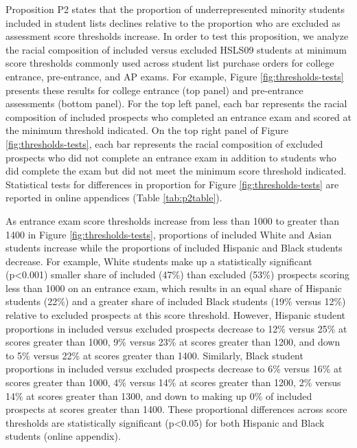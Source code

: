 \documentclass[
  12pt,
]{article}
\begin{document}
Proposition P2 states that the proportion of underrepresented minority students included in student lists declines relative to the proportion who are excluded as assessment score thresholds increase. In order to test this proposition, we analyze the racial composition of included versus excluded HSLS09 students at minimum score thresholds commonly used across student list purchase orders for college entrance, pre-entrance, and AP exams. For example, Figure \ref{fig:thresholds-tests} presents these results for college entrance (top panel) and pre-entrance assessments (bottom panel). For the top left panel, each bar represents the racial composition of included prospects who completed an entrance exam and scored at the minimum threshold indicated. On the top right panel of Figure \ref{fig:thresholds-tests}, each bar represents the racial composition of excluded prospects who did not complete an entrance exam in addition to students who did complete the exam but did not meet the minimum score threshold indicated. Statistical tests for differences in proportion for Figure \ref{fig:thresholds-tests} are reported in online appendices (Table \ref{tab:p2table}).

As entrance exam score thresholds increase from less than 1000 to greater than 1400 in Figure \ref{fig:thresholds-tests}, proportions of included White and Asian students increase while the proportions of included Hispanic and Black students decrease. For example, White students make up a statistically significant (p\textless0.001) smaller share of included (47\%) than excluded (53\%) prospects scoring less than 1000 on an entrance exam, which results in an equal share of Hispanic students (22\%) and a greater share of included Black students (19\% versus 12\%) relative to excluded prospects at this score threshold. However, Hispanic student proportions in included versus excluded prospects decrease to 12\% versus 25\% at scores greater than 1000, 9\% versus 23\% at scores greater than 1200, and down to 5\% versus 22\% at scores greater than 1400. Similarly, Black student proportions in included versus excluded prospects decrease to 6\% versus 16\% at scores greater than 1000, 4\% versus 14\% at scores greater than 1200, 2\% versus 14\% at scores greater than 1300, and down to making up 0\% of included prospects at scores greater than 1400. These proportional differences across score thresholds are statistically significant (p\textless0.05) for both Hispanic and Black students (online appendix).
\end{document}
